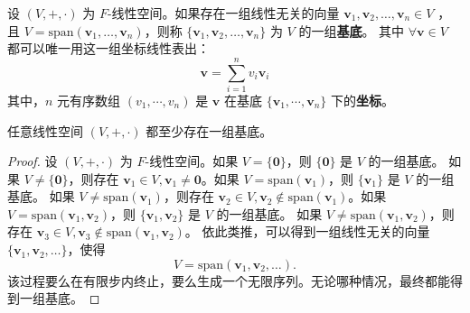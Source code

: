 \vspace{1em}
\begin{definition}
    设 $ (V,+,\cdot) $ 为 $ F $-线性空间。如果存在一组线性无关的向量 $ \mathbf{v}_1,\mathbf{v}_2,\ldots,\mathbf{v}_n\in V $ ，
    且 $ V=\mathrm{span}(\mathbf{v}_1,\ldots,\mathbf{v}_n) $，则称 $ \{\mathbf{v}_1,\mathbf{v}_2,\ldots,\mathbf{v}_n\} $ 为 $ V $ 的一组\textbf{基底}。
    其中 $\forall \mathbf{v}\in V$ 都可以唯一用这一组坐标线性表出：
    \[
        \mathbf{v} = \sum_{i=1}^{n} v_i \mathbf{v}_i
    \]
    其中，$n$ 元有序数组 $(v_1,\cdots,v_n)$ 是 $\mathbf{v}$ 在基底 $\{\mathbf{v}_1,\cdots,\mathbf{v}_n\}$ 下的\textbf{坐标}。
    \label{def:basis}
\end{definition}

\begin{proposition}
    任意线性空间 $ (V,+,\cdot) $ 都至少存在一组基底。
\end{proposition}
\begin{proof}
    设 $ (V,+,\cdot) $ 为 $ F $-线性空间。如果 $ V=\{\mathbf{0}\} $，则 $\{\mathbf{0}\}$ 是 $ V $ 的一组基底。
    如果 $ V\neq \{\mathbf{0}\} $，则存在 $ \mathbf{v}_1\in V, \mathbf{v}_1\neq \mathbf{0} $。如果 $ V=\mathrm{span}(\mathbf{v}_1) $，则 $\{\mathbf{v}_1\}$ 是 $ V $ 的一组基底。
    如果 $ V\neq \mathrm{span}(\mathbf{v}_1) $，则存在 $ \mathbf{v}_2\in V, \mathbf{v}_2\notin \mathrm{span}(\mathbf{v}_1) $。如果 $ V=\mathrm{span}(\mathbf{v}_1,\mathbf{v}_2) $，则 $\{\mathbf{v}_1,\mathbf{v}_2\}$ 是 $ V $ 的一组基底。
    如果 $ V\neq \mathrm{span}(\mathbf{v}_1,\mathbf{v}_2) $，则存在 $ \mathbf{v}_3\in V, \mathbf{v}_3\notin \mathrm{span}(\mathbf{v}_1,\mathbf{v}_2) $。
    依此类推，可以得到一组线性无关的向量 $\{\mathbf{v}_1,\mathbf{v}_2,\ldots\}$，使得
    \[
        V = \mathrm{span}(\mathbf{v}_1,\mathbf{v}_2,\ldots).
    \]
    该过程要么在有限步内终止，要么生成一个无限序列。无论哪种情况，最终都能得到一组基底。
\end{proof}


